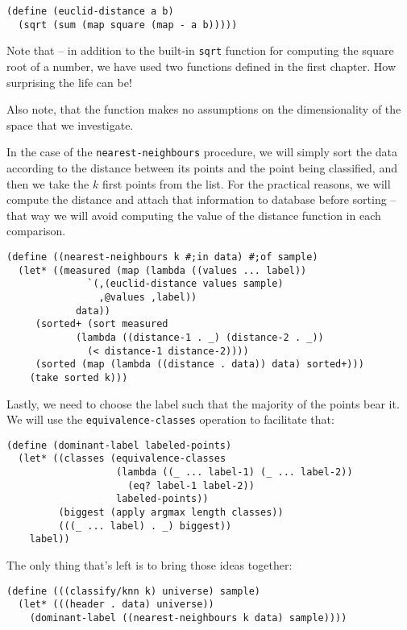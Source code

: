 \begin{Verbatim}[samepage=true]
(define (euclid-distance a b)
  (sqrt (sum (map square (map - a b)))))
\end{Verbatim}

Note that -- in addition to the built-in \texttt{sqrt} function
for computing the square root of a number, we have used two
functions defined in the first chapter. How surprising the
life can be!

Also note, that the function makes no assumptions on the
dimensionality of the space that we investigate.

In the case of the \texttt{nearest-neighbours} procedure,
we will simply sort the data according to the distance between
its points and the point being classified, and then we take
the $k$ first points from the list. For the practical reasons,
we will compute the distance and attach that information to
database before sorting -- that way we will avoid computing
the value of the distance function in each comparison.

\begin{Verbatim}[samepage=true]
(define ((nearest-neighbours k #;in data) #;of sample)
  (let* ((measured (map (lambda ((values ... label))
			  `(,(euclid-distance values sample) 
			    ,@values ,label))
			data))
	 (sorted+ (sort measured
			(lambda ((distance-1 . _) (distance-2 . _))
			  (< distance-1 distance-2))))
	 (sorted (map (lambda ((distance . data)) data) sorted+)))
    (take sorted k)))
\end{Verbatim}

Lastly, we need to choose the label such that the majority
of the points bear it. We will use the \texttt{equivalence-classes}
operation to facilitate that:

\begin{Verbatim}[samepage=true]
(define (dominant-label labeled-points)
  (let* ((classes (equivalence-classes
                   (lambda ((_ ... label-1) (_ ... label-2))
                     (eq? label-1 label-2))
                   labeled-points))
         (biggest (apply argmax length classes))
         (((_ ... label) . _) biggest))
    label))
\end{Verbatim}

The only thing that's left is to bring those ideas together:

\begin{Verbatim}[samepage=true]
(define (((classify/knn k) universe) sample)
  (let* (((header . data) universe))
    (dominant-label ((nearest-neighbours k data) sample))))
\end{Verbatim}

